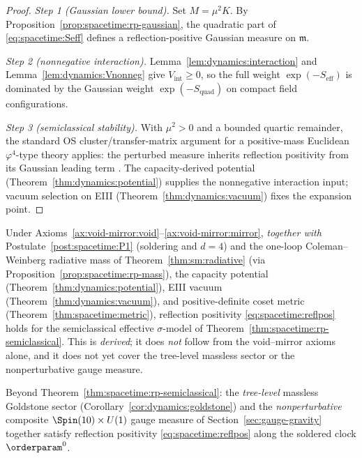 \begin{proof}
\emph{Step 1 (Gaussian lower bound).}
Set $M=\mu^2 K$. By Proposition~\ref{prop:spacetime:rp-gaussian}, the
quadratic part of \eqref{eq:spacetime:Seff} defines a reflection-positive
Gaussian measure on $\mathfrak{m}$.

\emph{Step 2 (nonnegative interaction).}
Lemma~\ref{lem:dynamics:interaction} and Lemma~\ref{lem:dynamics:Vnonneg}
give $V_{\mathrm{int}}\geq0$, so the full weight
$\exp(-S_{\mathrm{eff}})$ is dominated by the Gaussian weight
$\exp(-S_{\mathrm{quad}})$ on compact field configurations.

\emph{Step 3 (semiclassical stability).}
With $\mu^2>0$ and a bounded quartic remainder, the standard OS
cluster/transfer-matrix argument for a positive-mass Euclidean
$\varphi^4$-type theory applies: the perturbed measure inherits
reflection positivity from its Gaussian leading term
\cite{GlimmJaffe1987,OsterwalderSchrader1973}. The capacity-derived
potential (Theorem~\ref{thm:dynamics:potential}) supplies the nonnegative
interaction input; vacuum selection on EIII
(Theorem~\ref{thm:dynamics:vacuum}) fixes the expansion point.
\end{proof}

\begin{corollary}
\label{cor:spacetime:rp-derived}
Under Axioms~\ref{ax:void-mirror:void}--\ref{ax:void-mirror:mirror},
\emph{together with} Postulate~\ref{post:spacetime:P1} (soldering and $d=4$)
and the one-loop Coleman--Weinberg radiative mass of
Theorem~\ref{thm:sm:radiative} (via Proposition~\ref{prop:spacetime:rp-mass}),
the capacity potential (Theorem~\ref{thm:dynamics:potential}), EIII vacuum
(Theorem~\ref{thm:dynamics:vacuum}), and positive-definite coset metric
(Theorem~\ref{thm:spacetime:metric}), reflection positivity
\eqref{eq:spacetime:reflpos} holds for the semiclassical effective
$\sigma$-model of Theorem~\ref{thm:spacetime:rp-semiclassical}. This is
\emph{derived}; it does \emph{not} follow from the void--mirror axioms alone,
and it does not yet cover the tree-level massless sector or
the nonperturbative gauge measure.
\end{corollary}

\begin{postulate}
\label{post:spacetime:P5}
Beyond Theorem~\ref{thm:spacetime:rp-semiclassical}: the \emph{tree-level}
massless Goldstone sector (Corollary~\ref{cor:dynamics:goldstone}) and the
\emph{nonperturbative} composite $\Spin(10)\times U(1)$ gauge measure of
Section~\ref{sec:gauge-gravity} together satisfy reflection positivity
\eqref{eq:spacetime:reflpos} along the soldered clock $\orderparam^0$.
\end{postulate}

